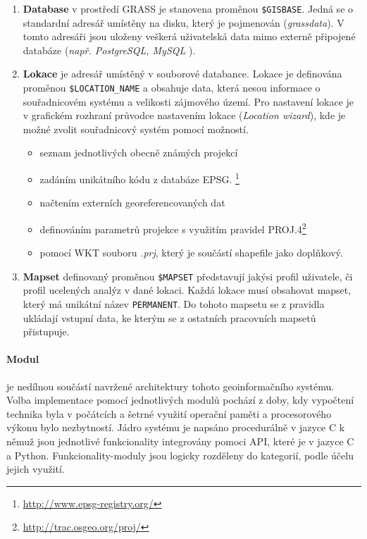 \documentclass[a4paper,12pt,oneside]{report}
\begin{document}
\begin{enumerate}
\item \textbf{Database} v prostředí GRASS je stanovena proměnou \texttt{\$GISBASE}. Jedná se o standardní adresář umístěny na disku, který je pojmenován (\textit{grassdata}). V tomto adresáři jsou uloženy veškerá uživatelská data mimo externě připojené databáze (\textit{např. PostgreSQL, MySQL }).

\item \textbf{Lokace} je adresář umístěný v souborové databance. Lokace je definována proměnou   \texttt{\$LOCATION\_NAME}
a obsahuje data, která nesou informace o souřadnicovém systému a velikosti zájmového území. Pro nastavení lokace je v grafickém rozhraní průvodce nastavením lokace (\textit{Location wizard}), kde je možné zvolit souřadnicový systém pomocí možností.
\begin{itemize}
\item seznam jednotlivých obecně známých projekcí 
\item zadáním unikátního kódu z databáze \acs{EPSG}. \footnote{\url{http://www.epsg-registry.org/}}
\item načtením externích georeferencovaných dat
\item definováním parametrů projekce s využitím pravidel PROJ.4\footnote{\url{http://trac.osgeo.org/proj/}}
\item pomocí \ac{WKT} souboru \emph{.prj}, který je součástí shapefile jako doplňkový.
\end{itemize}

\item \textbf{Mapset} definovaný proměnou \texttt{\$MAPSET} představují jakýsi profil uživatele, či profil ucelených analýz  v dané lokaci. Každá lokace musí obsahovat mapset, který má unikátní název \texttt{PERMANENT}. Do tohoto mapsetu se z pravidla ukládají vstupní data, ke kterým se z ostatních pracovních mapsetů přistupuje.
\end{enumerate}



\paragraph*{Modul} je nedílnou součástí navržené architektury tohoto geoinformačního systému. Volba implementace pomocí jednotlivých modulů pochází z doby, kdy vypočtení technika byla v počátcích a šetrné využití operační paměti a procesorového výkonu bylo nezbytností. Jádro systému je napsáno procedurálně v jazyce C k němuž jsou  jednotlivé funkcionality integrovány pomoci \acs{API}, které je v jazyce C a Python. Funkcionality-moduly jsou logicky rozděleny do kategorií, podle účelu jejich využití.
\end{document}
